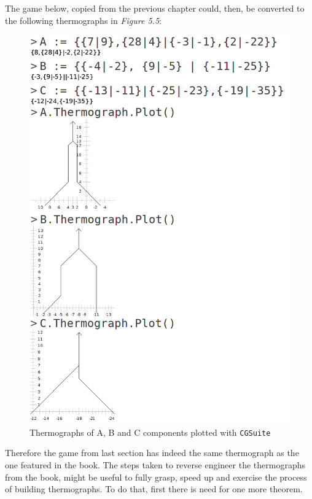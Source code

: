 The game below, copied from the previous chapter could, then, be converted to the following thermographs in \textit{Figure 5.5}:

\begingroup
{}%

\endgroup
\begin{figure}[H]
\begin{center}
\includegraphics[scale=0.3]{../images/resulting_thermographs.png}
\end{center}
\caption{Thermographs of A, B and C components plotted with \texttt{CGSuite}}
\end{figure}

Therefore the game from last section has indeed the same thermograph as the one featured in the book. The steps taken to reverse engineer the thermographs from the book, might be useful to fully grasp, speed up and exercise the process of building thermographs. To do that, first there is need for one more theorem.

